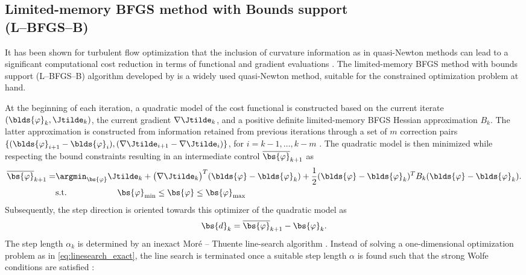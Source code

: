 	\pagebreak

	\subsection{Limited-memory BFGS method with Bounds support\\(L--BFGS--B)}
	It has been shown for turbulent flow optimization that the inclusion of curvature information as in quasi-Newton methods can lead to a significant computational cost reduction in terms of functional and gradient evaluations \citep{nita2016efficiency}. The limited-memory BFGS method with bounds support (L--BFGS--B) algorithm developed by \cite{byrd1995limited} is a widely used quasi-Newton method, suitable for the constrained optimization problem at hand. 
	
	At the beginning of each iteration, a quadratic model of the cost functional is constructed based on the current iterate $(\blds{\varphi}_k, \Jtilde_k)$, the current gradient $\nabla \Jtilde_k$, and a positive definite limited-memory BFGS Hessian approximation $B_k$. The latter approximation is constructed from information retained from previous iterations through a set of $m$ correction pairs $\{(\blds{\varphi}_{i+1}- \blds{\varphi}_i), (\nabla \Jtilde_{i+1} - \nabla \Jtilde_i)\}$, for $i = k-1, \dots, k-m$ \citep{liu1989limited}. The quadratic model is then minimized while respecting the bound constraints resulting in an intermediate control $\overline{\bs{\varphi}}_{k+1}$ as 
	\begin{align}
	\overline{\bs{\varphi}}_{k+1} = &\argmin_{\bs{\varphi}}{\Jtilde_k + \big(\nabla \Jtilde_k\big)^T (\blds{\varphi} - \blds{\varphi}_k) + \frac{1}{2} (\blds{\varphi} - \blds{\varphi}_k)^T B_k (\blds{\varphi} - \blds{\varphi}_k)}. \nonumber\\
		&{\rm s.t.} \qquad \qquad \qquad \bs{\varphi}_{\rm min} \leq \bs{\varphi} \leq \bs{\varphi}_{\rm max}
	\end{align}
	Subsequently, the step direction is oriented towards this optimizer of the quadratic model as
	\begin{equation}
		\bs{d}_k = \overline{\bs{\varphi}}_{k+1} - \bs{\varphi}_k. 
	\end{equation}
	The step length $\alpha_k$ is determined by an inexact Mor\'e -- Thuente line-search algorithm \citep{more1994line}. Instead of solving a one-dimensional optimization problem as in \eqref{eq:linesearch_exact}, the line search is terminated once a suitable step length $\alpha$ is found such that the strong Wolfe conditions are satisfied \citep{wolfe1969convergence, wolfe1971convergence}:
